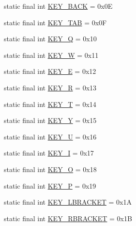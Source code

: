 \begin{DoxyCompactItemize}
\item 
static final int \mbox{\hyperlink{classorg_1_1newdawn_1_1slick_1_1_input_a49040ea830add899a39c2d8a00289962}{K\+E\+Y\+\_\+\+B\+A\+CK}} = 0x0E
\item 
static final int \mbox{\hyperlink{classorg_1_1newdawn_1_1slick_1_1_input_ade8d3a1987440415b73646904186f439}{K\+E\+Y\+\_\+\+T\+AB}} = 0x0F
\item 
static final int \mbox{\hyperlink{classorg_1_1newdawn_1_1slick_1_1_input_ab56c342afdd5921dc3f4ef0f70756fd9}{K\+E\+Y\+\_\+Q}} = 0x10
\item 
static final int \mbox{\hyperlink{classorg_1_1newdawn_1_1slick_1_1_input_ab656a3565be42ef77ad4fcfad3dade83}{K\+E\+Y\+\_\+W}} = 0x11
\item 
static final int \mbox{\hyperlink{classorg_1_1newdawn_1_1slick_1_1_input_a44e0a889ab9116cf6cb3181763f95db1}{K\+E\+Y\+\_\+E}} = 0x12
\item 
static final int \mbox{\hyperlink{classorg_1_1newdawn_1_1slick_1_1_input_a245e2c0e63893fba0a97729d7b14a296}{K\+E\+Y\+\_\+R}} = 0x13
\item 
static final int \mbox{\hyperlink{classorg_1_1newdawn_1_1slick_1_1_input_a7994a45ceeca171a8199d2fa537a3dc3}{K\+E\+Y\+\_\+T}} = 0x14
\item 
static final int \mbox{\hyperlink{classorg_1_1newdawn_1_1slick_1_1_input_a2ad27d44a2a1d0a552782937687a401e}{K\+E\+Y\+\_\+Y}} = 0x15
\item 
static final int \mbox{\hyperlink{classorg_1_1newdawn_1_1slick_1_1_input_aaed85f3da5fe25f4f3a27772ee95603f}{K\+E\+Y\+\_\+U}} = 0x16
\item 
static final int \mbox{\hyperlink{classorg_1_1newdawn_1_1slick_1_1_input_aa06fab994960ffbc78cf5007bf0a17b1}{K\+E\+Y\+\_\+I}} = 0x17
\item 
static final int \mbox{\hyperlink{classorg_1_1newdawn_1_1slick_1_1_input_a21a8588ecb9129cbf7b7c78201d77ae1}{K\+E\+Y\+\_\+O}} = 0x18
\item 
static final int \mbox{\hyperlink{classorg_1_1newdawn_1_1slick_1_1_input_a7f0cd3d5a9fed7575c4231e7b61a50f5}{K\+E\+Y\+\_\+P}} = 0x19
\item 
static final int \mbox{\hyperlink{classorg_1_1newdawn_1_1slick_1_1_input_aee5bb614d243155b30d0382ab6527509}{K\+E\+Y\+\_\+\+L\+B\+R\+A\+C\+K\+ET}} = 0x1A
\item 
static final int \mbox{\hyperlink{classorg_1_1newdawn_1_1slick_1_1_input_adbb1048a2ed3517c1e3a7664196a602e}{K\+E\+Y\+\_\+\+R\+B\+R\+A\+C\+K\+ET}} = 0x1B
\item 

\end{DoxyCompactItemize}
